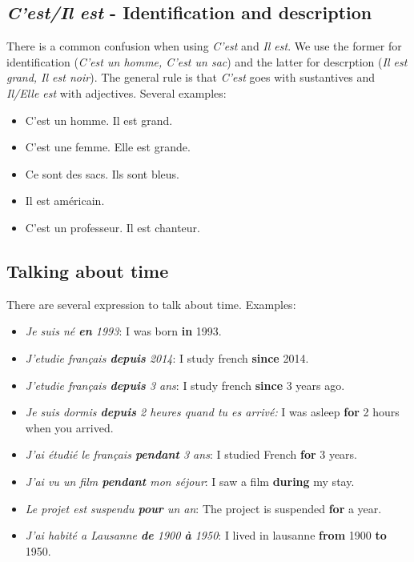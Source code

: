 \documentclass[palatino]{nicenotes}
\begin{document}
\subsection{\textit{C'est/Il est} - Identification and description}

There is a common confusion when using \textit{C'est} and \textit{Il est}. We use the former for identification (\textit{C'est un homme, C'est un sac}) and the latter for descrption (\textit{Il est grand, Il est noir}). The general rule is that \textit{C'est} goes with sustantives and \textit{Il/Elle est} with adjectives. Several examples:


\begin{itemize}
\item C'est un homme. Il est grand.
\item C'est une femme. Elle est grande.
\item Ce sont des sacs. Ils sont bleus.
\item Il est américain.
\item C'est un professeur. Il est chanteur.
\end{itemize}

\subsection{Talking about time}

There are several expression to talk about time. Examples:

\begin{itemize}
\item \textit{Je suis né \textbf{en} 1993}: I was born \textbf{in} 1993.
\item \textit{J'etudie français \textbf{depuis} 2014}: I study french \textbf{since} 2014.
\item \textit{J'etudie français \textbf{depuis} 3 ans}: I study french \textbf{since} 3 years ago.
\item \textit{Je suis dormis \textbf{depuis} 2 heures quand tu es arrivé:} I was asleep \textbf{for} 2 hours when you arrived.
\item \textit{J'ai étudié le français \textbf{pendant} 3 ans}: I studied French \textbf{for} 3 years.
\item \textit{J'ai vu un film \textbf{pendant} mon séjour}: I saw a film \textbf{during} my stay.
\item \textit{Le projet est suspendu \textbf{pour} un an}: The project is suspended \textbf{for} a year.
\item \textit{J'ai habité a Lausanne \textbf{de} 1900 \textbf{à} 1950}: I lived in lausanne \textbf{from} 1900 \textbf{to} 1950.
\end{itemize}
\end{document}
